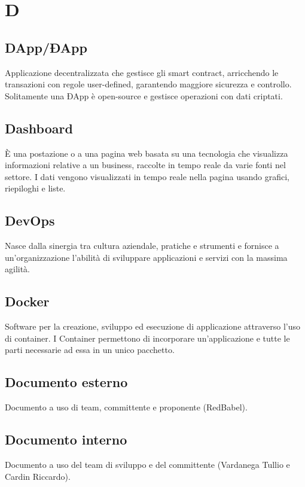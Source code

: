 \section*{D}
\subsection*{DApp/ÐApp}
Applicazione decentralizzata che gestisce gli smart contract, arricchendo le transazioni con regole user-defined, garantendo maggiore sicurezza e controllo. Solitamente una ÐApp è open-source e  gestisce operazioni con dati criptati.

\subsection*{Dashboard}
È una postazione o a una pagina web basata su una tecnologia che visualizza informazioni relative a un business, raccolte in tempo reale da varie fonti nel settore. I dati vengono visualizzati in tempo reale nella pagina usando grafici, riepiloghi e liste.

\subsection*{DevOps}
Nasce dalla sinergia tra cultura aziendale, pratiche e strumenti e fornisce a un'organizzazione l'abilità di sviluppare applicazioni e servizi con la massima agilità.

\subsection*{Docker}
Software per la creazione, sviluppo ed esecuzione di applicazione attraverso l’uso di container. I Container
permettono di incorporare un’applicazione e tutte le parti necessarie ad essa in un unico pacchetto.

\subsection*{Documento esterno}
Documento a uso di team, committente e proponente (RedBabel).

\subsection*{Documento interno}
Documento a uso del team di sviluppo e del committente (Vardanega Tullio e Cardin Riccardo).

